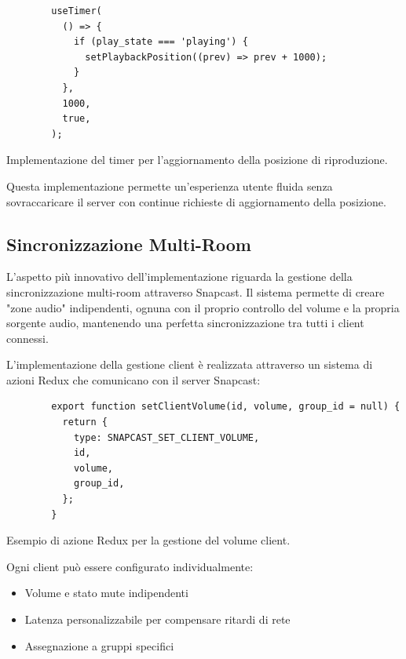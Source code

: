 \begin{table}[H]
  \begin{algorithm}[H]
    \caption{}
    \BlankLine
      \begin{verbatim}
        useTimer(
          () => {
            if (play_state === 'playing') {
              setPlaybackPosition((prev) => prev + 1000);
            }
          },
          1000,
          true,
        );
      \end{verbatim}
    \end{algorithm}
    \caption{Implementazione del timer per l'aggiornamento della posizione di riproduzione.}
    \label{tab:timer_implementazione}
\end{table}

Questa implementazione permette un'esperienza utente fluida senza sovraccaricare il server con continue richieste di aggiornamento della posizione.


\subsection{Sincronizzazione Multi-Room}

L'aspetto più innovativo dell'implementazione riguarda la gestione della sincronizzazione multi-room attraverso Snapcast. Il sistema permette di creare "zone audio" indipendenti, ognuna con il proprio controllo del volume e la propria sorgente audio, mantenendo una perfetta sincronizzazione tra tutti i client connessi.

L'implementazione della gestione client è realizzata attraverso un sistema di azioni Redux che comunicano con il server Snapcast:

\begin{table}[H]
  \begin{algorithm}[H]
    \caption{}
    \BlankLine
      \begin{verbatim}
        export function setClientVolume(id, volume, group_id = null) {
          return {
            type: SNAPCAST_SET_CLIENT_VOLUME,
            id,
            volume,
            group_id,
          };
        }
      \end{verbatim}
    \end{algorithm}
    \caption{Esempio di azione Redux per la gestione del volume client.}
    \label{tab:redux_azione}
\end{table}

Ogni client può essere configurato individualmente:

\begin{itemize}
    \item Volume e stato mute indipendenti
    \item Latenza personalizzabile per compensare ritardi di rete
    \item Assegnazione a gruppi specifici
\end{itemize}

